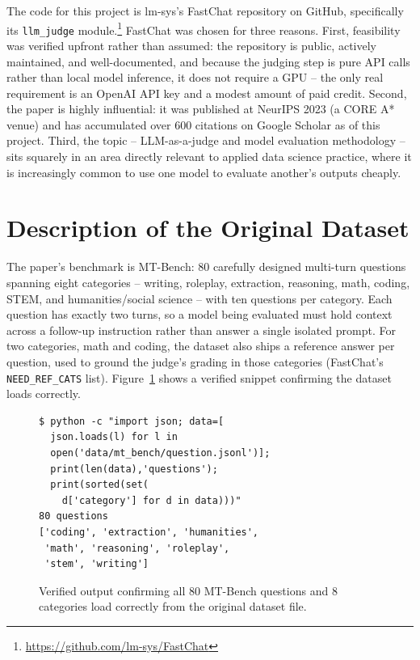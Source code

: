 \documentclass[11pt,twocolumn]{article}
\begin{document}
The code for this project is lm-sys's FastChat repository on GitHub, specifically its
\texttt{llm\_judge} module.\footnote{\url{https://github.com/lm-sys/FastChat}} FastChat was chosen
for three reasons. First, feasibility was verified upfront rather than assumed: the repository is
public, actively maintained, and well-documented, and because the judging step is pure API calls
rather than local model inference, it does not require a GPU -- the only real requirement is an
OpenAI API key and a modest amount of paid credit. Second, the paper is highly influential: it was
published at NeurIPS 2023 (a CORE A* venue) and has accumulated over 600 citations on Google
Scholar as of this project. Third, the topic -- LLM-as-a-judge and model evaluation methodology --
sits squarely in an area directly relevant to applied data science practice, where it is
increasingly common to use one model to evaluate another's outputs cheaply.

\section{Description of the Original Dataset}

The paper's benchmark is MT-Bench: 80 carefully designed multi-turn questions spanning eight
categories -- writing, roleplay, extraction, reasoning, math, coding, STEM, and humanities/social
science -- with ten questions per category. Each question has exactly two turns, so a model being
evaluated must hold context across a follow-up instruction rather than answer a single isolated
prompt. For two categories, math and coding, the dataset also ships a reference answer per question,
used to ground the judge's grading in those categories (FastChat's \texttt{NEED\_REF\_CATS} list).
Figure~\ref{fig:question-snippet} shows a verified snippet confirming the dataset loads correctly.

\begin{figure}[h]
\centering
\footnotesize
\begin{verbatim}
$ python -c "import json; data=[
  json.loads(l) for l in
  open('data/mt_bench/question.jsonl')];
  print(len(data),'questions');
  print(sorted(set(
    d['category'] for d in data)))"
80 questions
['coding', 'extraction', 'humanities',
 'math', 'reasoning', 'roleplay',
 'stem', 'writing']
\end{verbatim}
\caption{Verified output confirming all 80 MT-Bench questions and 8 categories load correctly from
the original dataset file.}
\label{fig:question-snippet}
\end{figure}
\end{document}
